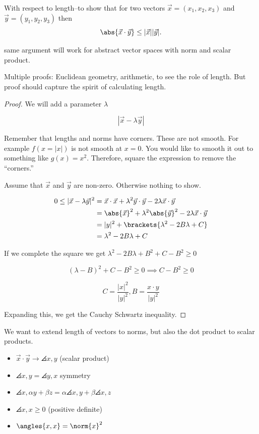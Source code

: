 \documentclass{scrreprt}
\begin{document}
\begin{theorem}
	With respect to length--to show that for two vectors $\vec{x} = (x_1, x_2, x_3)$ and $\vec{y} = (y_1, y_2, y_3)$ then
	\[
		\abs{\vec{x}\cdot \vec{y}} \leq |\vec{x}| |\vec{y}|.
	\]

	same argument will work for abstract vector spaces with norm and scalar product.

	Multiple proofs: Euclidean geometry, arithmetic, to see the role of length. But proof should capture the spirit of calculating length.

	\begin{proof}
		We will add a parameter $\lambda$

		\[
			|\vec{x} - \lambda \vec{y}|
		\]

		Remember that lengths and norms have corners. These are not smooth.
		For example $f(x=|x|)$ is not smooth at $x=0$. You would like to smooth it
		out to something like $g(x)=x^2$. Therefore, square the expression to remove the ``corners.''

		Assume that $\vec{x}$ and $\vec{y}$ are non-zero. Otherwise nothing to show.

		\begin{align*}
			0 \leq |\vec{x}-\lambda \vec{y}|^2 & = \vec{x}\cdot \vec{x} + \lambda^2\vec{y}\cdot \vec{y} - 2\lambda\vec{x}\cdot \vec{y} \\ &= \abs{\vec{x}}^2 + \lambda^2\abs{\vec{y}}^2 - 2\lambda\vec{x}\cdot \vec{y} \\
			                                   & = |y|^2 + \brackets{\lambda^2-2B\lambda+C}                                            \\
			                                   & = \lambda^2 - 2B\lambda + C
		\end{align*}

		If we complete the square we get $\lambda^2-2B\lambda + B^2 + C - B^2\geq 0$

		\[
			(\lambda - B)^2 + C - B^2 \geq 0 \implies \boxed{C-B^2\geq 0}
		\]

		\[
			C = \frac{|x|^2}{|y|^2}, B = \frac{x\cdot y}{|y|^2}
		\]

		Expanding this, we get the Cauchy Schwartz inequality.
	\end{proof}
\end{theorem}

We want to extend length of vectors to norms, but also the dot product to scalar products.

\begin{itemize}
	\item $\vec{x}\cdot \vec{y}\rightarrow \angles{x, y}$ (scalar product)
	\item $\angles{x,y}=\angles{y,x}$ symmetry
	\item $\angles{x,\alpha y + \beta z} = \alpha\angles{x, y} + \beta \angles{x, z}$
	\item $\angles{x,x} \geq 0$ (positive definite)
	\item $\angles{x,x} = \norm{x}^2$
\end{itemize}
\end{document}
